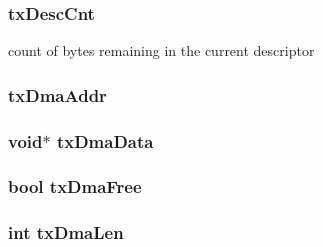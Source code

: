 \label{classNSGigE_a617a181e3d109f5a02baf11f4d9464c8}
\hypertarget{classNSGigE_a3d31947542c05cb041ee95b39ea18c5c}{
\subsubsection[{txDescCnt}]{ {\bf txDescCnt}}}
\label{classNSGigE_a3d31947542c05cb041ee95b39ea18c5c}
count of bytes remaining in the current descriptor \hypertarget{classNSGigE_aef3a8dd866e8017fd7a675414596ec6b}{
\subsubsection[{txDmaAddr}]{ {\bf txDmaAddr}}}
\label{classNSGigE_aef3a8dd866e8017fd7a675414596ec6b}
\hypertarget{classNSGigE_ae2121dfc4012d186f5762f53c7f9e248}{
\subsubsection[{txDmaData}]{\setlength{\rightskip}{0pt plus 5cm}void$\ast$ {\bf txDmaData}}}
\label{classNSGigE_ae2121dfc4012d186f5762f53c7f9e248}
\hypertarget{classNSGigE_a5cda9472c6a37cb671af71d4196e0f80}{
\subsubsection[{txDmaFree}]{\setlength{\rightskip}{0pt plus 5cm}bool {\bf txDmaFree}}}
\label{classNSGigE_a5cda9472c6a37cb671af71d4196e0f80}
\hypertarget{classNSGigE_a5782be4cae30f9377ab0c645a9f65892}{
\subsubsection[{txDmaLen}]{\setlength{\rightskip}{0pt plus 5cm}int {\bf txDmaLen}}}
